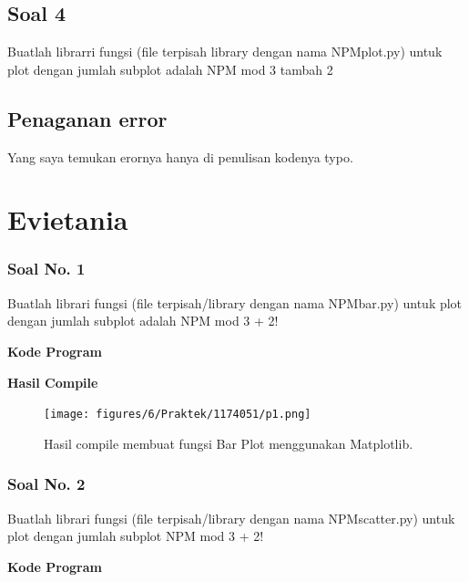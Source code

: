 

\subsection{Soal 4}
Buatlah librarri fungsi (file terpisah library dengan nama NPMplot.py) untuk plot dengan jumlah subplot adalah NPM mod 3 tambah  2



\subsection{Penaganan error}
Yang saya temukan erornya hanya di penulisan kodenya typo.

\section{Evietania}
\subsubsection{Soal No. 1}
\hfill \break
Buatlah librari fungsi (file terpisah/library dengan nama NPMbar.py) untuk plot dengan jumlah subplot adalah NPM mod 3 + 2!

\hfill \break
\textbf{Kode Program}



\hfill \break
\textbf{Hasil Compile}

\begin{figure}[H]
	\texttt{[image: figures/6/Praktek/1174051/p1.png]}
	\centering
	\caption{Hasil compile membuat fungsi Bar Plot menggunakan Matplotlib.}
\end{figure}

\subsubsection{Soal No. 2}
\hfill \break
Buatlah librari fungsi (file terpisah/library dengan nama NPMscatter.py) untuk plot dengan jumlah subplot NPM mod 3 + 2!

\hfill \break
\textbf{Kode Program}



